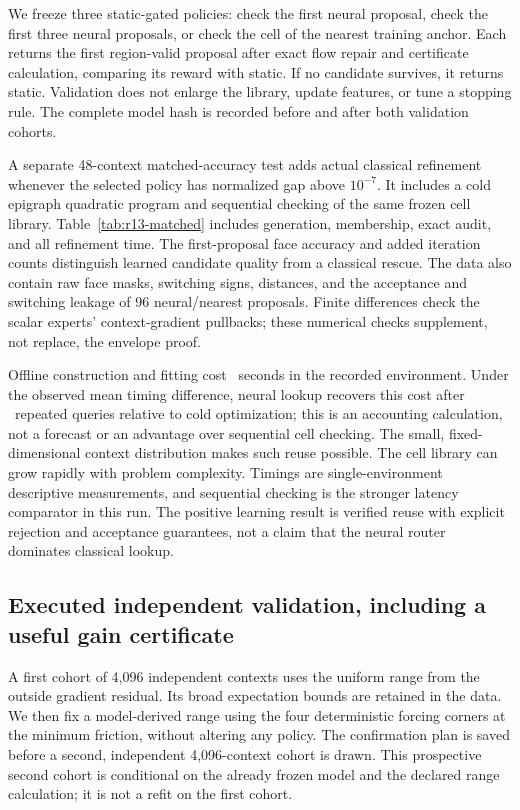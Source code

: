 We freeze three static-gated policies: check the first neural proposal, check the first three neural proposals, or check the cell of the nearest training anchor. Each returns the first region-valid proposal after exact flow repair and certificate calculation, comparing its reward with static. If no candidate survives, it returns static. Validation does not enlarge the library, update features, or tune a stopping rule. The complete model hash is recorded before and after both validation cohorts.

A separate 48-context matched-accuracy test adds actual classical refinement whenever the selected policy has normalized gap above $10^{-7}$. It includes a cold epigraph quadratic program and sequential checking of the same frozen cell library. Table~\ref{tab:r13-matched} includes generation, membership, exact audit, and all refinement time. The first-proposal face accuracy and added iteration counts distinguish learned candidate quality from a classical rescue. The data also contain raw face masks, switching signs, distances, and the acceptance and switching leakage of 96 neural/nearest proposals. Finite differences check the scalar experts' context-gradient pullbacks; these numerical checks supplement, not replace, the envelope proof.


Offline construction and fitting cost \RThirteenOffline\ seconds in the recorded environment. Under the observed mean timing difference, neural lookup recovers this cost after \RThirteenBreakEven\ repeated queries relative to cold optimization; this is an accounting calculation, not a forecast or an advantage over sequential cell checking. The small, fixed-dimensional context distribution makes such reuse possible. The cell library can grow rapidly with problem complexity. Timings are single-environment descriptive measurements, and sequential checking is the stronger latency comparator in this run. The positive learning result is verified reuse with explicit rejection and acceptance guarantees, not a claim that the neural router dominates classical lookup.

\subsection{Executed independent validation, including a useful gain certificate}
A first cohort of 4,096 independent contexts uses the uniform range from the outside gradient residual. Its broad expectation bounds are retained in the data. We then fix a model-derived range using the four deterministic forcing corners at the minimum friction, without altering any policy. The confirmation plan is saved before a second, independent 4,096-context cohort is drawn. This prospective second cohort is conditional on the already frozen model and the declared range calculation; it is not a refit on the first cohort.

